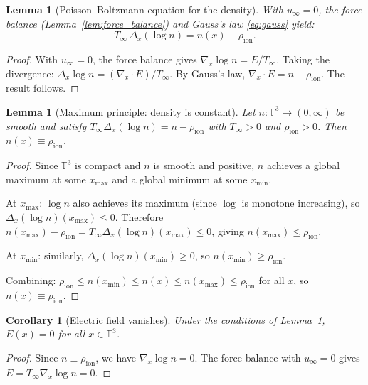 \documentclass[11pt]{article}
\newcommand{\T}{\mathbb{T}}
\newtheorem{lemma}[theorem]{Lemma}
\newtheorem{corollary}[theorem]{Corollary}
\begin{document}
\begin{lemma}[Poisson--Boltzmann equation for the density]
\label{lem:poisson_boltzmann}
With $u_\infty = 0$, the force balance (Lemma~\ref{lem:force_balance}) and Gauss's law \eqref{eq:gauss} yield:
\[
T_\infty \, \Delta_x(\log n) = n(x) - \rho_{\mathrm{ion}}.
\]
\end{lemma}

\begin{proof}
With $u_\infty = 0$, the force balance gives $\nabla_x \log n = E / T_\infty$. Taking the divergence: $\Delta_x \log n = (\nabla_x \cdot E)/T_\infty$. By Gauss's law, $\nabla_x \cdot E = n - \rho_{\mathrm{ion}}$. The result follows.
\end{proof}

\begin{lemma}[Maximum principle: density is constant]
\label{lem:density_constant}
Let $n : \T^3 \to (0, \infty)$ be smooth and satisfy $T_\infty \Delta_x(\log n) = n - \rho_{\mathrm{ion}}$ with $T_\infty > 0$ and $\rho_{\mathrm{ion}} > 0$. Then $n(x) \equiv \rho_{\mathrm{ion}}$.
\end{lemma}

\begin{proof}
Since $\T^3$ is compact and $n$ is smooth and positive, $n$ achieves a global maximum at some $x_{\max}$ and a global minimum at some $x_{\min}$.

At $x_{\max}$: $\log n$ also achieves its maximum (since $\log$ is monotone increasing), so $\Delta_x(\log n)(x_{\max}) \leq 0$. Therefore $n(x_{\max}) - \rho_{\mathrm{ion}} = T_\infty \Delta_x(\log n)(x_{\max}) \leq 0$, giving $n(x_{\max}) \leq \rho_{\mathrm{ion}}$.

At $x_{\min}$: similarly, $\Delta_x(\log n)(x_{\min}) \geq 0$, so $n(x_{\min}) \geq \rho_{\mathrm{ion}}$.

Combining: $\rho_{\mathrm{ion}} \leq n(x_{\min}) \leq n(x) \leq n(x_{\max}) \leq \rho_{\mathrm{ion}}$ for all $x$, so $n(x) \equiv \rho_{\mathrm{ion}}$.
\end{proof}

\begin{corollary}[Electric field vanishes]
\label{cor:E_zero}
Under the conditions of Lemma~\ref{lem:density_constant}, $E(x) = 0$ for all $x \in \T^3$.
\end{corollary}

\begin{proof}
Since $n \equiv \rho_{\mathrm{ion}}$, we have $\nabla_x \log n = 0$. The force balance with $u_\infty = 0$ gives $E = T_\infty \nabla_x \log n = 0$.
\end{proof}
\end{document}
